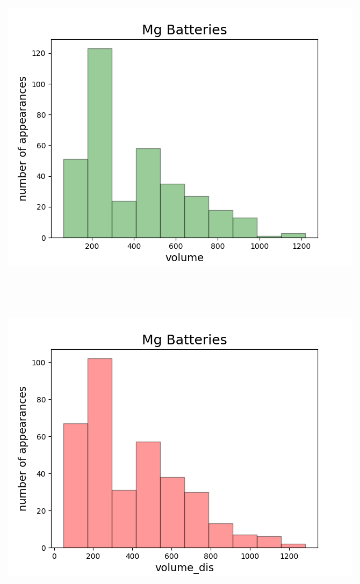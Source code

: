 \begin{figure}[h]
\begin{subfigure}{0.2\textwidth}
     \end{subfigure}
          ~ 
     \begin{subfigure}{0.2\textwidth}
         \centering
         \includegraphics[width=\linewidth]{result/figures/distribution/Mg_distrof_volume.png}
         
     \end{subfigure}
          ~ 
     \begin{subfigure}{0.2\textwidth}
         \centering
         \includegraphics[width=\linewidth]{result/figures/distribution/Mg_distrof_volume_dis.png}
         

\end{subfigure}
\end{figure}
